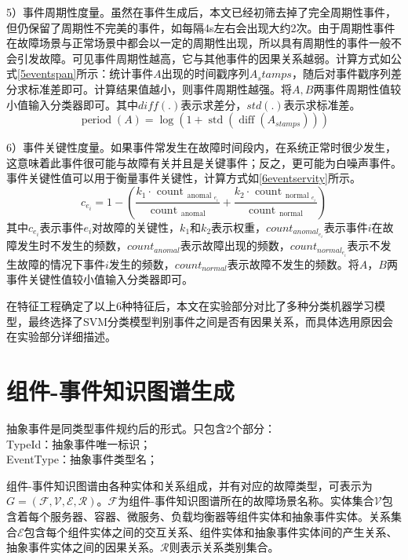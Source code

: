 5）事件周期性度量。虽然在事件生成后，本文已经初筛去掉了完全周期性事件，但仍保留了周期性不完美的事件，如每隔4s左右会出现大约2次。由于周期性事件在故障场景与正常场景中都会以一定的周期性出现，所以具有周期性的事件一般不会引发故障。可见事件周期性越高，它与其他事件的因果关系越弱。计算方式如公式\ref{5eventspan}所示：统计事件$A$出现的时间戳序列$A_stamps$，随后对事件戳序列差分求标准差即可。计算结果值越小，则事件周期性越强。将$A,B$两事件周期性值较小值输入分类器即可。其中$diff(.)$表示求差分，$std(.)$表示求标准差。
\begin{equation}
    \operatorname{period}(A)=\log \left(1+\operatorname{std}\left(\operatorname{diff}\left(A_{stamps}\right)\right)\right)\label{5eventspan}
\end{equation}

6）事件关键性度量。如果事件常发生在故障时间段内，在系统正常时很少发生，这意味着此事件很可能与故障有关并且是关键事件；反之，更可能为白噪声事件。事件关键性值可以用于衡量事件关键性，计算方式如\ref{6eventservity}所示。
\begin{equation}
    c_{e_{i}}=1-\left(\frac{k_{1} \cdot \text { count }_{\text {anomal }_{e_{i}}}}{\text { count }_{\text {anomal }}}+\frac{k_{2} \cdot \text { count }_{\text {normal }_{e_{i}}}}{\text { count }_{\text {normal }}}\right)\label{6eventservity}
\end{equation}
其中$c_{e_i}$表示事件$e_i$对故障的关键性，$k_1$和$k_2$表示权重，${count}_{{anomal}_{e_i}}$表示事件$i$在故障发生时不发生的频数，${count}_{anomal}$表示故障出现的频数，${count}_{{normal}_{e_i}}$表示不发生故障的情况下事件$i$发生的频数，${count}_{normal}$表示故障不发生的频数。将$A$，$B$两事件关键性值较小值输入分类器即可。

在特征工程确定了以上6种特征后，本文在实验部分对比了多种分类机器学习模型，最终选择了SVM分类模型判别事件之间是否有因果关系，而具体选用原因会在实验部分详细描述。

\section{组件-事件知识图谱生成}\label{graph-generate}
\begin{definition}[抽象事件]
    抽象事件是同类型事件规约后的形式。只包含2个部分：
    \\TypeId：抽象事件唯一标识；
    \\EventType：抽象事件类型名；
    \label{abstract_event}
\end{definition}
\begin{definition}[组件-事件知识图谱]
    组件-事件知识图谱由各种实体和关系组成，并有对应的故障类型，可表示为$G=(\mathcal{F}, \mathcal{V}, \mathcal{E}, \mathcal{R})$。$\mathcal{F}$为组件-事件知识图谱所在的故障场景名称。实体集合$\mathcal{V}$包含着每个服务器、容器、微服务、负载均衡器等组件实体和抽象事件实体。关系集合$\mathcal{E}$包含每个组件实体之间的交互关系、组件实体和抽象事件实体间的产生关系、抽象事件实体之间的因果关系。$\mathcal{R}$则表示关系类别集合。
    \label{device-event-graph}
\end{definition}

